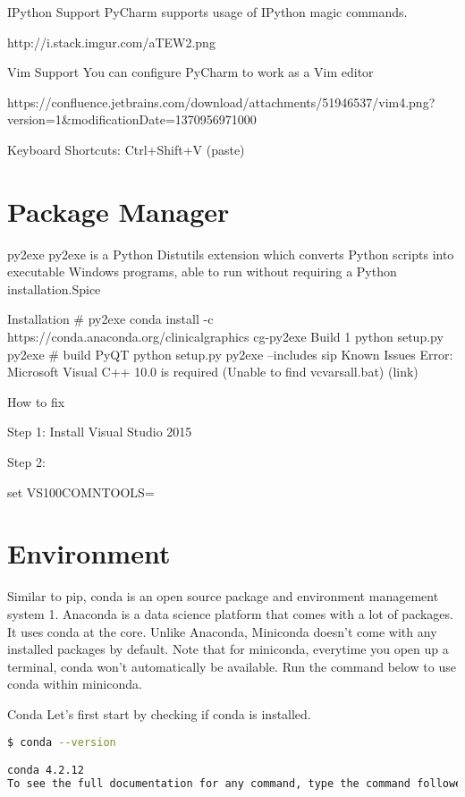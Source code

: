 IPython Support
PyCharm supports usage of IPython magic commands.

http://i.stack.imgur.com/aTEW2.png

Vim Support
You can configure PyCharm to work as a Vim editor

https://confluence.jetbrains.com/download/attachments/51946537/vim4.png?version=1&modificationDate=1370956971000

Keyboard Shortcuts: Ctrl+Shift+V (paste)

\section{Package Manager}

py2exe
py2exe is a Python Distutils extension which converts Python scripts into executable Windows programs, able to run without requiring a Python installation.Spice

Installation
# py2exe
conda install -c https://conda.anaconda.org/clinicalgraphics cg-py2exe
Build 1
python setup.py py2exe
# build PyQT
python setup.py py2exe --includes sip
Known Issues
Error: Microsoft Visual C++ 10.0 is required (Unable to find vcvarsall.bat) (link)

How to fix

Step 1: Install Visual Studio 2015

Step 2:

set VS100COMNTOOLS=%

\section{Environment}

Similar to pip, conda is an open source package and environment management system 1. Anaconda is a data science platform that comes with a lot of packages. It uses conda at the core. Unlike Anaconda, Miniconda doesn't come with any installed packages by default. Note that for miniconda, everytime you open up a terminal, conda won’t automatically be available. Run the command below to use conda within miniconda.

Conda
Let’s first start by checking if conda is installed.

\begin{lstlisting}[language=bash]
$ conda --version

conda 4.2.12
To see the full documentation for any command, type the command followed by --help. For example, to learn about the conda update command:
\end{lstlisting}


